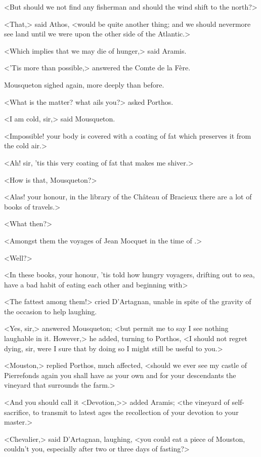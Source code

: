 <But should we not find any fisherman and should the wind shift to the north?>

<That,> said Athos, <would be quite another thing; and we should nevermore see land until we were upon the other side of the Atlantic.>

<Which implies that we may die of hunger,> said Aramis.

<'Tis more than possible,> answered the Comte de la Fère.

Mousqueton sighed again, more deeply than before.

<What is the matter? what ails you?> asked Porthos.

<I am cold, sir,> said Mousqueton.

<Impossible! your body is covered with a coating of fat which preserves it from the cold air.>

<Ah! sir, 'tis this very coating of fat that makes me shiver.>

<How is that, Mousqueton?>

<Alas! your honour, in the library of the Château of Bracieux there are a lot of books of travels.>

<What then?>

<Amongst them the voyages of Jean Mocquet in the time of .>

<Well?>

<In these books, your honour, 'tis told how hungry voyagers, drifting out to sea, have a bad habit of eating each other and beginning with\longdash>

<The fattest among them!> cried D'Artagnan, unable in spite of the gravity of the occasion to help laughing.

<Yes, sir,> answered Mousqueton; <but permit me to say I see nothing laughable in it. However,> he added, turning to Porthos, <I should not regret dying, sir, were I sure that by doing so I might still be useful to you.>

<Mouston,> replied Porthos, much affected, <should we ever see my castle of Pierrefonds again you shall have as your own and for your descendants the vineyard that surrounds the farm.>

<And you should call it <Devotion,>> added Aramis; <the vineyard of self-sacrifice, to transmit to latest ages the recollection of your devotion to your master.>

<Chevalier,> said D'Artagnan, laughing, <you could eat a piece of Mouston, couldn't you, especially after two or three days of fasting?>

